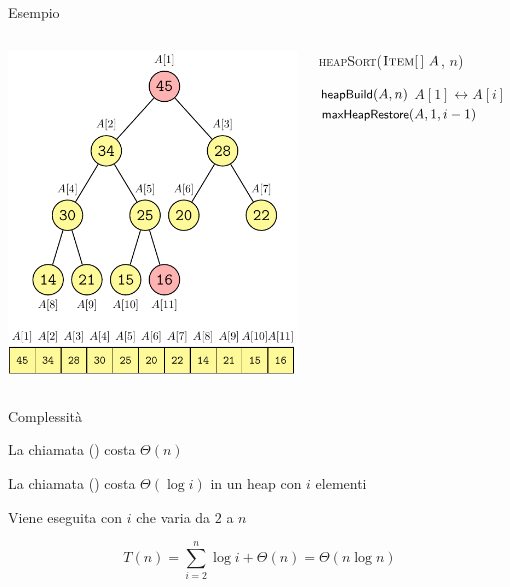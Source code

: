 \begin{frame}{Esempio}
\begin{columns}[T]
\begin{overprint}
\includegraphics[width=\textwidth,page=21]{heapsort.pdf}
\end{overprint}
\vspace{-9pt}
\begin{Procedure}
\caption[A]{\textsc{heapSort}($\textsc{Item}[\,]\ A$, \INTEGER $n$)}
$\textsf{{\small heapBuild}}(A, n)$\;
{
  \alert<1,5,7,9,11,13,15,17,19>{$A[1] \leftrightarrow A[i]$}\;
  \alert<2-4,6,8,10,12,14,16,18,20>{$\textsf{{\small maxHeapRestore}}(A, 1, i-1)$}\;
}
\end{Procedure}
\end{columns}
\end{frame}

\begin{frame}{Complessità}

\begin{myboxtitle}[Complessità]
\pause
\BIL
\item La chiamata \heapbuild() costa $\Theta(n)$
\item La chiamata \maxheapify() costa $\Theta(\log i)$ in un
heap con $i$ elementi
\item Viene eseguita con $i$ che varia da $2$ a $n$
\EIL

\[
T(n) = \sum_{i=2}^n \log i + \Theta(n) = \Theta(n \log n)
\]
\end{myboxtitle}

\end{frame}


